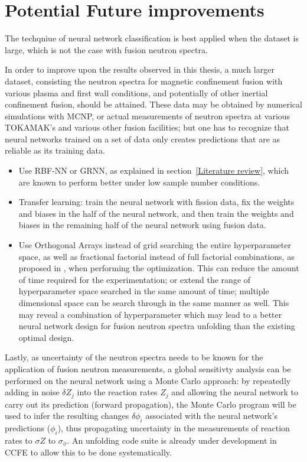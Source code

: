 \documentclass[a4paper, 12pt]{article}
\begin{document}
\section{Potential Future improvements}
The techqniue of neural network classification is best applied when the dataset is large, which is not the case with fusion neutron spectra.

In order to improve upon the results observed in this thesis, a much larger dataset, consisting the neutron spectra for magnetic confinement fusion with various plasma and first wall conditions, and potentially of other inertial confinement fusion, should be attained. These data may be obtained by numerical simulations with MCNP, or actual measurements of neutron spectra at various TOKAMAK's and various other fusion facilities; but one has to recognize that neural networks trained on a set of data only creates predictions that are as reliable as its training data.%

\begin{itemize}
    \item Use RBF-NN or GRNN, as explained in section~\ref{Literature review}, which are known to perform better under low sample number conditions.
    \item Transfer learning\cite{TransferLearning}: train the neural network with fission data, fix the weights and biases in the half of the neural network, and then train the weights and biases in the remaining half of the neural network using fusion data.
    \item Use Orthogonal Arrays instead of grid searching the entire hyperparameter space, as well as fractional factorial instead of full factorial combinations, as proposed in \cite{RDANNM}, when performing the optimization. This can reduce the amount of time required for the experimentation; or extend the range of hyperparameter space searched in the same amount of time; multiple dimensional space can be search through in the same manner as well. This may reveal a combination of hyperparameter which may lead to a better neural network design for fusion neutron spectra unfolding than the existing optimal design.
\end{itemize}

Lastly, as uncertainty of the neutron spectra needs to be known for the application of fusion neutron measurements, a global sensitivty analysis can be performed on the neural network using a Monte Carlo approach: by repeatedly adding in noise $\delta Z_j$ into the reaction rates $Z_j$ and allowing the neural network to carry out its prediction (forward propagation), the Monte Carlo program will be used to infer the resulting changes $\delta \phi_i$ associated with the neural network's predictions ($\phi_i$), thus propagating uncertainty in the measurements of reaction rates to $\sigma{Z}$ to $\sigma_{\phi}$. An unfolding code suite is already under development in CCFE to allow this to be done systematically.
\end{document}
